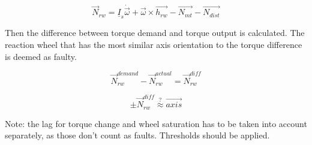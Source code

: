 \begin{equation}
\vec{N}_{rw} = \underline{I}_s \dot{\vec{\omega}}  + \vec{\omega} \times \vec{h_{rw}} - \vec{N_{mt}} - \vec{N_{dist}}
\end{equation}

Then the difference between torque demand and torque output is calculated. The reaction wheel that has the most similar axis orientation to the torque difference is deemed as faulty.

\begin{equation}
\vec{N}_{rw}^{demand} - \vec{N}_{rw}^{actual} = 
\vec{N}_{rw}^{diff}
\end{equation}

\begin{equation}
 \pm \vec{N}_{rw}^{diff}  \stackrel{?}{\approx} \vec{axis} 
\end{equation}



Note: the lag for torque change and wheel saturation has to be taken into account separately, as those don't count as faults. 
Thresholds should be applied.